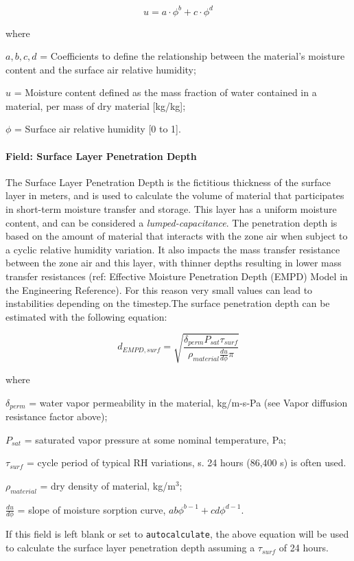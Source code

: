 \[ u = a \cdot \phi^b + c \cdot \phi^d \]

where

\(a,b,c,d\) = Coefficients to define the relationship between the material's moisture content and the surface air relative humidity;

\(u\) = Moisture content defined as the mass fraction of water contained in a material, per mass of dry material {[}kg/kg{]};

\(\phi\) = Surface air relative humidity {[}0 to 1{]}.

\paragraph{Field: Surface Layer Penetration Depth}\label{field-surface-layer-penetration-depth}

The Surface Layer Penetration Depth is the fictitious thickness of the surface layer in meters, and is used to calculate the volume of material that participates in short-term moisture transfer and storage. This layer has a uniform moisture content, and can be considered a \emph{lumped-capacitance}. The penetration depth is based on the amount of material that interacts with the zone air when subject to a cyclic relative humidity variation. It also impacts the mass transfer resistance between the zone air and this layer, with thinner depths resulting in lower mass transfer resistances (ref: Effective Moisture Penetration Depth (EMPD) Model in the Engineering Reference). For this reason very small values can lead to instabilities depending on the timestep.The surface penetration depth can be estimated with the following equation:

\[ d_{EMPD,surf} = \sqrt{\frac{\delta_{perm} P_{sat} \tau_{surf}}{\rho_{material} \frac{du}{d\phi} \pi}} \]

where

\(\delta_{perm}\) = water vapor permeability in the material, kg/m-s-Pa (see Vapor diffusion resistance factor above);

\(P_{sat}\) = saturated vapor pressure at some nominal temperature, Pa;

\(\tau_{surf}\) = cycle period of typical RH variations, s. 24 hours (86,400 s) is often used.

\(\rho_{material}\) = dry density of material, kg/m$^3$;

\(\frac{du}{d\phi}\) = slope of moisture sorption curve, \(a b \phi^{b-1} + c d \phi^{d-1}\).

If this field is left blank or set to \texttt{autocalculate}, the above equation will be used to calculate the surface layer penetration depth assuming a $\tau_{surf}$ of 24 hours.

